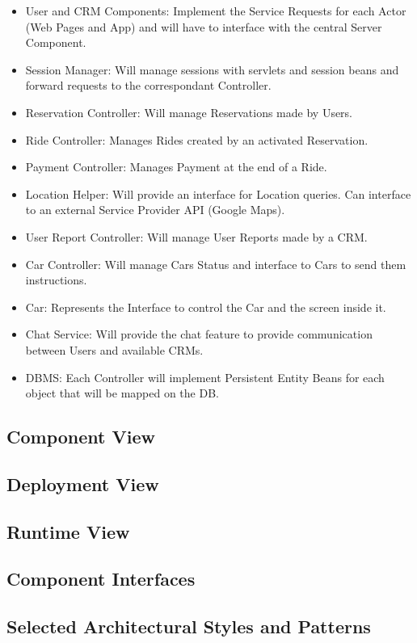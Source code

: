 \documentclass[a4paper]{article}
\begin{document}
\begin{itemize}
\item User and CRM Components: Implement the Service Requests for each Actor (Web Pages and App) and will have to interface with the central Server Component.
\item Session Manager: Will manage sessions with servlets and session beans and forward requests to the correspondant Controller.
\item Reservation Controller: Will manage Reservations made by Users.
\item Ride Controller: Manages Rides created by an activated Reservation.
\item Payment Controller: Manages Payment at the end of a Ride.
\item Location Helper: Will provide an interface for Location queries. Can interface to an external Service Provider API (Google Maps).
\item User Report Controller: Will manage User Reports made by a CRM.
\item Car Controller: Will manage Cars Status and interface to Cars to send them instructions.
\item Car: Represents the Interface to control the Car and the screen inside it.
\item Chat Service: Will provide the chat feature to provide communication between Users and available CRMs.
\item DBMS: Each Controller will implement Persistent Entity Beans for each object that will be mapped on the DB.
\end{itemize}

\subsection{Component View}

\subsection{Deployment View}
\subsection{Runtime View}
\subsection{Component Interfaces}
\subsection{Selected Architectural Styles and Patterns}
\end{document}
